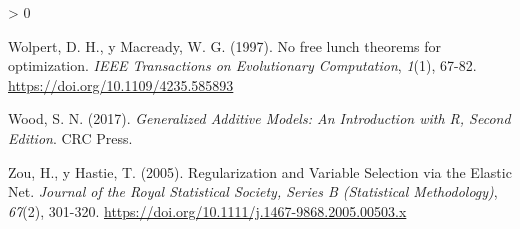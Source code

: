 \documentclass[
  spanish,
]{book}
\theoremstyle{break}
\newlength{\cslhangindent}
\newenvironment{CSLReferences}[2] %
 {%
  \setlength{\parindent}{0pt}
  \ifodd #1 \everypar{\setlength{\hangindent}{\cslhangindent}}\ignorespaces\fi
  \ifnum #2 > 0
  \setlength{\parskip}{#2\baselineskip}
  \fi
 }%
 {}
\theoremstyle{definition}
\theoremstyle{definition}
\theoremstyle{definition}
\theoremstyle{definition}
\theoremstyle{remark}
\begin{document}
\begin{CSLReferences}{1}{0}
\leavevmode\hypertarget{ref-wolpert1997no}{}%
Wolpert, D. H., y Macready, W. G. (1997). No free lunch theorems for optimization. \emph{IEEE Transactions on Evolutionary Computation}, \emph{1}(1), 67-82. \url{https://doi.org/10.1109/4235.585893}

\leavevmode\hypertarget{ref-wood2017generalized}{}%
Wood, S. N. (2017). \emph{Generalized Additive Models: An Introduction with R, Second Edition}. CRC Press.

\leavevmode\hypertarget{ref-zou2005regularization}{}%
Zou, H., y Hastie, T. (2005). Regularization and Variable Selection via the Elastic Net. \emph{Journal of the Royal Statistical Society, Series B (Statistical Methodology)}, \emph{67}(2), 301-320. \url{https://doi.org/10.1111/j.1467-9868.2005.00503.x}

\end{CSLReferences}
\end{document}
